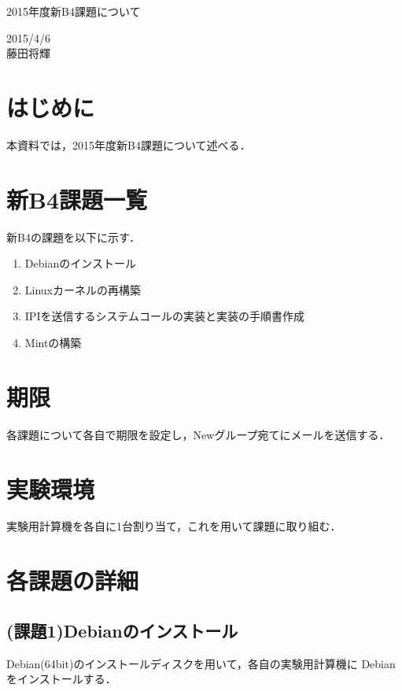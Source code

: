 \documentclass[12pt]{jsarticle}
\begin{document}

\begin{center}
{\LARGE 2015年度新B4課題について}
\end{center}

\begin{flushright}
  2015/4/6\\
  藤田将輝
\end{flushright}
\section{はじめに}
本資料では，2015年度新B4課題について述べる．
\section{新B4課題一覧}
新B4の課題を以下に示す．
\begin{enumerate}
    \item Debianのインストール
    \item Linuxカーネルの再構築
    \item IPIを送信するシステムコールの実装と実装の手順書作成
    \item Mintの構築
\end{enumerate}
\section{期限}
各課題について各自で期限を設定し，Newグループ宛てにメールを送信する．
\section{実験環境}
実験用計算機を各自に1台割り当て，これを用いて課題に取り組む．
\section{各課題の詳細}
\subsection{(課題1)Debianのインストール}
Debian(64bit)のインストールディスクを用いて，各自の実験用計算機に
Debianをインストールする．
\end{document}
